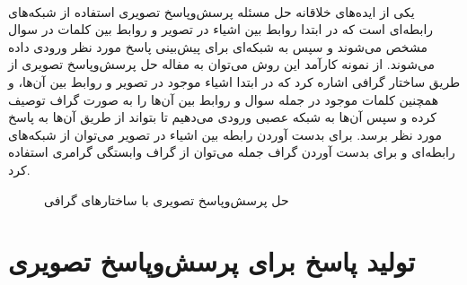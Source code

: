 \paragraph{}{
    یکی از ایده‌های خلاقانه حل مسئله پرسش‌و‌پاسخ تصویری استفاده از شبکه‌های رابطه‌ای
    است که در ابتدا روابط بین اشیاء در تصویر و روابط بین کلمات در سوال مشخص
    می‌شوند و سپس به شبکه‌ای برای پیش‌بینی پاسخ مورد نظر ورودی داده می‌شوند. 
    از نمونه کارآمد این روش می‌توان به مفاله حل پرسش‌وپاسخ تصویری از طریق 
    ساختار گرافی 
    \cite{teney2017graph}
    اشاره کرد که در ابتدا اشیاء موجود در تصویر و روابط بین آن‌ها،‌
    و همچنین کلمات موجود در جمله سوال و روابط بین آن‌ها را
    به صورت گراف توصیف کرده و سپس آن‌ها به شبکه‌ عصبی ورودی می‌دهیم تا 
    بتواند از طریق آن‌ها به پاسخ مورد نظر برسد.
    برای بدست آوردن رابطه بین اشیاء در تصویر می‌توان از شبکه‌های رابطه‌ای 
    و برای بدست آوردن گراف جمله می‌توان از گراف وابستگی گرامری 
    استفاده کرد. 

    \begin{figure}[H]
        \caption{حل پرسش‌وپاسخ تصویری با ساختارهای گرافی}
        \label{fig:object_relation}
    \end{figure}
    
}

\section{
    تولید پاسخ برای پرسش‌و‌پاسخ تصویری
}
\label{sec:answer_generation}
